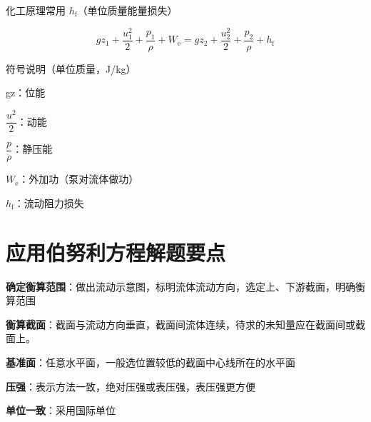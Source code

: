 \documentclass{book}
\DeclareRobustCommand{\bluebold}[1]{\textbf{\textcolor[rgb]{0.31,0.63,0.86}{#1}}}
\begin{document}
化工原理常用 $h_\mathrm{f}$（单位质量能量损失）

\begin{equation}
gz_1 + \frac{u_1^2}{2} + \frac{p_1}{\rho} + W_\mathrm{e} = gz_2 + \frac{u_2^2}{2} + \frac{p_2}{\rho} + h_\mathrm{f}
\end{equation}

符号说明（单位质量，J/kg）

\vspace{6pt}
gz：位能

\vspace{6pt}
\(\dfrac{u^2}{2}\)：动能

\vspace{6pt}
\(\dfrac{p}{\rho}\)：静压能

\vspace{6pt}
$W_\mathrm{e}$：外加功（泵对流体做功）

\vspace{6pt}
$h_\mathrm{f}$：流动阻力损失

\section{应用伯努利方程解题要点}

\bluebold{确定衡算范围}：做出流动示意图，标明流体流动方向，选定上、下游截面，明确衡算范围

\bluebold{衡算截面}：截面与流动方向垂直，截面间流体连续，待求的未知量应在截面间或截面上。

\bluebold{基准面}：任意水平面，一般选位置较低的截面中心线所在的水平面


\bluebold{压强}：表示方法一致，绝对压强或表压强，表压强更方便

\bluebold{单位一致}：采用国际单位
\end{document}
